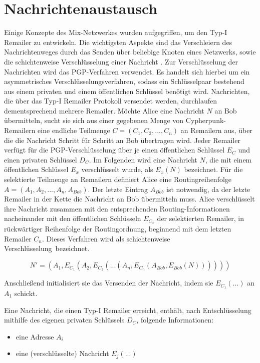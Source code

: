 \section{Nachrichtenaustausch}
Einige Konzepte des Mix-Netzwerkes wurden aufgegriffen, um den Typ-I Remailer zu entwickeln. Die wichtigsten Aspekte sind das Verschleiern des Nachrichtenweges durch das Senden über beliebige Knoten eines Netzwerks, sowie die schichtenweise Verschlüsselung einer Nachricht \cite[S. 84]{sambleben2013informationstechnologie}. Zur Verschlüsselung der Nachrichten wird das PGP-Verfahren verwendet. Es handelt sich hierbei um ein asymmetrisches Verschlüsselungsverfahren, sodass ein Schlüsselpaar bestehend aus einem privaten und einem öffentlichen Schlüssel benötigt wird.
Nachrichten, die über das Typ-I Remailer Protokoll versendet werden, durchlaufen dementsprechend mehrere Remailer. Möchte Alice eine Nachricht \(N\) an Bob übermitteln, sucht sie sich aus einer gegebenen Menge von Cypherpunk-Remailern eine endliche Teilmenge \(C = (C_1, C_2, ..., C_n)\) an Remailern aus, über die die Nachricht Schritt für Schritt an Bob übertragen wird. Jeder Remailer verfügt für die PGP-Verschlüsselung über je einen öffentlichen Schlüssel \(E_C\) und einen privaten Schlüssel \(D_C\). Im Folgenden wird eine Nachricht \(N\), die mit einem öffentlichen Schlüssel \(E_x\) verschlüsselt wurde, als \(E_x(N)\) bezeichnet. Für die selektierte Teilmenge an Remailern definiert Alice eine Routingreihenfolge \(A = (A_1, A_2, ..., A_n, A_{Bob})\). Der letzte Eintrag \(A_{Bob}\) ist notwendig, da der letzte Remailer in der Kette die Nachricht an Bob übermitteln muss.
Alice verschlüsselt ihre Nachricht zusammen mit den entsprechenden Routing-Informationen nacheinander mit den öffentlichen Schlüsseln \(E_{C_x}\) der selektierten Remailer, in rückwärtiger Reihenfolge der Routingordnung, beginnend mit dem letzten Remailer \(C_n\). Dieses Verfahren wird als \glqq schichtenweise Verschlüsselung\grqq ~bezeichnet.

\begin{equation}
N' = (A_1, E_{C_1}(A_2, E_{C_2} (... (A_n,  E_{C_n}(A_{Bob}, E_{Bob}(N))))))
\end{equation}

Anschließend initialisiert sie das Versenden der Nachricht, indem sie \(E_{C_1}(\dots)\) an \(A_1\) schickt.

Eine Nachricht, die einen Typ-I Remailer erreicht, enthält, nach Entschlüsselung mithilfe des eigenen privaten Schlüssels \(D_C\), folgende Informationen:
\begin{itemize}
\item eine Adresse \(A_i\)
\item eine (verschlüsselte) Nachricht \(E_j(...)\)
\end{itemize}

